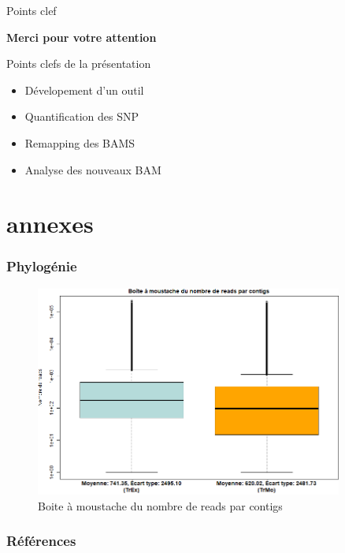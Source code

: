 \begin{frame}{Points clef}
    \begin{center}
        \huge \textbf{Merci pour votre attention}
    \end{center}

    \begin{block}{Points clefs de la présentation}
        \begin{itemize}
            \item Dévelopement d'un outil
            \item Quantification des SNP
            \item Remapping des BAMS
            \item Analyse des nouveaux BAM
        \end{itemize}
    \end{block}
       


\end{frame}


\appendix
\section*{annexes}
\begin{frame}
   \frametitle{Phylogénie}
   
\end{frame}

\begin{frame}{}
   \begin{figure}[ht]
      \centering
       \includegraphics[width=0.9\textwidth]{./Illustrations/boxplotTr.png}
       \caption{Boite à moustache du nombre de reads par contigs}
       \label{fig:BoxPlotContigs}
   \end{figure}

\end{frame}

\begin{frame}[allowframebreaks]
   \frametitle{Références}
   \printbibliography
\end{frame}




